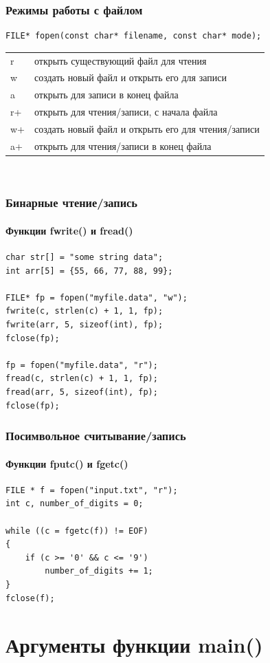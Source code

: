 \documentclass[12pt,pdf,hyperref={unicode}]{beamer}
\begin{document}
\begin{frame}[fragile]
\frametitle{Режимы работы с файлом} 
\begin{lstlisting}
FILE* fopen(const char* filename, const char* mode);
\end{lstlisting}
\begin{tabular}{ l || l }
  r & открыть существующий файл для чтения \\
  w & создать новый файл и открыть его для записи \\
  a & открыть для записи в конец файла \\
  r+ & открыть для чтения/записи, с начала файла  \\
  w+ & создать новый файл и открыть его для чтения/записи \\
  a+ & открыть для чтения/записи в конец файла \\
\end{tabular}\\
\end{frame}




\begin{frame}[fragile]
\frametitle{Бинарные чтение/запись}  
\framesubtitle{Функции fwrite() и fread()}  
\begin{lstlisting}
char str[] = "some string data";
int arr[5] = {55, 66, 77, 88, 99};

FILE* fp = fopen("myfile.data", "w");
fwrite(c, strlen(c) + 1, 1, fp);
fwrite(arr, 5, sizeof(int), fp);
fclose(fp);

fp = fopen("myfile.data", "r");
fread(c, strlen(c) + 1, 1, fp);
fread(arr, 5, sizeof(int), fp);
fclose(fp);
\end{lstlisting}
\end{frame}

\begin{frame}[fragile]
\frametitle{Посимвольное считывание/запись}  
\framesubtitle{Функции fputc() и fgetc()}  
\begin{lstlisting}
FILE * f = fopen("input.txt", "r");
int c, number_of_digits = 0;

while ((c = fgetc(f)) != EOF)
{
    if (c >= '0' && c <= '9')
        number_of_digits += 1;
}
fclose(f);
\end{lstlisting}
\end{frame}


\section{Аргументы функции main()}
\end{document}

